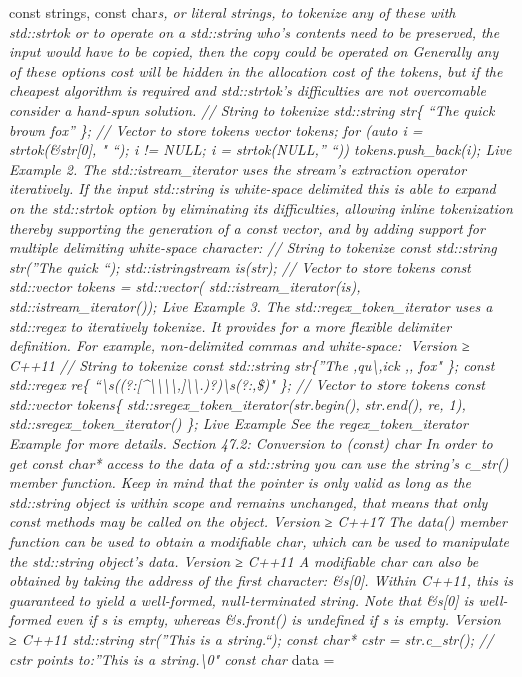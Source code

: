 const strings, const char\emph{s, or literal strings, to tokenize any of
these with std::strtok or to operate on a std::string who's contents
need to be preserved, the input would have to be copied, then the copy
could be operated on Generally any of these options cost will be hidden
in the allocation cost of the tokens, but if the cheapest algorithm is
required and std::strtok's diﬃculties are not overcomable consider a
hand-spun solution. // String to tokenize std::string str\{ ``The quick
brown fox'' \}; // Vector to store tokens vector tokens; for (auto i =
strtok(\&str{[}0{]}, " ``); i != NULL; i = strtok(NULL,'' ``))
tokens.push\_back(i); Live Example 2. The std::istream\_iterator uses
the stream's extraction operator iteratively. If the input std::string
is white-space delimited this is able to expand on the std::strtok
option by eliminating its diﬃculties, allowing inline tokenization
thereby supporting the generation of a const vector, and by adding
support for multiple delimiting white-space character: // String to
tokenize const std::string str(''The quick \tbrown \nfox``);
std::istringstream is(str); // Vector to store tokens const std::vector
tokens = std::vector( std::istream\_iterator(is),
std::istream\_iterator()); Live Example 3. The
std::regex\_token\_iterator uses a std::regex to iteratively tokenize.
It provides for a more ﬂexible delimiter deﬁnition. For example,
non-delimited commas and white-space: Version ≥ C++11 // String to
tokenize const std::string str\{''The ,qu\textbackslash,ick ,\tbrown,
fox" \}; const std::regex re\{
``\textbackslash s\emph{((?:{[}\^{}\textbackslash\textbackslash\textbackslash\textbackslash,{]}\textbar\textbackslash\textbackslash.)}?)\textbackslash s\emph{(?:,\textbar\$)"
\}; // Vector to store tokens const std::vector tokens\{
std::sregex\_token\_iterator(str.begin(), str.end(), re, 1),
std::sregex\_token\_iterator() \}; Live Example See the
regex\_token\_iterator Example for more details. Section 47.2:
Conversion to (const) char} In order to get const char* access to the
data of a std::string you can use the string's c\_str() member function.
Keep in mind that the pointer is only valid as long as the std::string
object is within scope and remains unchanged, that means that only const
methods may be called on the object. Version ≥ C++17 The data() member
function can be used to obtain a modiﬁable char\emph{, which can be used
to manipulate the std::string object's data. Version ≥ C++11 A modiﬁable
char} can also be obtained by taking the address of the ﬁrst character:
\&s{[}0{]}. Within C++11, this is guaranteed to yield a well-formed,
null-terminated string. Note that \&s{[}0{]} is well-formed even if s is
empty, whereas \&s.front() is undeﬁned if s is empty. Version ≥ C++11
std::string str(''This is a string.``); const char* cstr = str.c\_str();
// cstr points to:''This is a string.\textbackslash0" const char} data =
